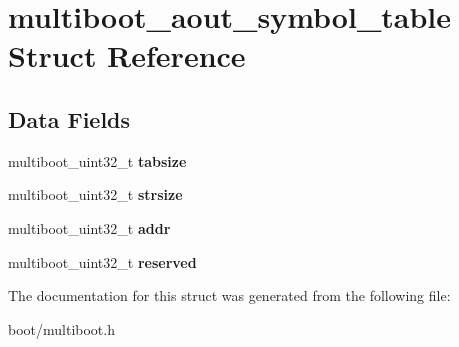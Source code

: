 \hypertarget{structmultiboot__aout__symbol__table}{
\section{multiboot\_\-aout\_\-symbol\_\-table Struct Reference}
\label{structmultiboot__aout__symbol__table}
}
\subsection*{Data Fields}
\begin{DoxyCompactItemize}
\item 
\hypertarget{structmultiboot__aout__symbol__table_a3c9cc58c068678c095a7695f74375ca2}{
multiboot\_\-uint32\_\-t {\bfseries tabsize}}
\label{structmultiboot__aout__symbol__table_a3c9cc58c068678c095a7695f74375ca2}

\item 
\hypertarget{structmultiboot__aout__symbol__table_af9876cbe1b37935ed039c855f04b760e}{
multiboot\_\-uint32\_\-t {\bfseries strsize}}
\label{structmultiboot__aout__symbol__table_af9876cbe1b37935ed039c855f04b760e}

\item 
\hypertarget{structmultiboot__aout__symbol__table_ab399f68a251079409489149a5d48033f}{
multiboot\_\-uint32\_\-t {\bfseries addr}}
\label{structmultiboot__aout__symbol__table_ab399f68a251079409489149a5d48033f}

\item 
\hypertarget{structmultiboot__aout__symbol__table_a2317e4e566e417b8fb3502074e0807d7}{
multiboot\_\-uint32\_\-t {\bfseries reserved}}
\label{structmultiboot__aout__symbol__table_a2317e4e566e417b8fb3502074e0807d7}

\end{DoxyCompactItemize}


The documentation for this struct was generated from the following file:\begin{DoxyCompactItemize}
\item 
boot/multiboot.h\end{DoxyCompactItemize}

